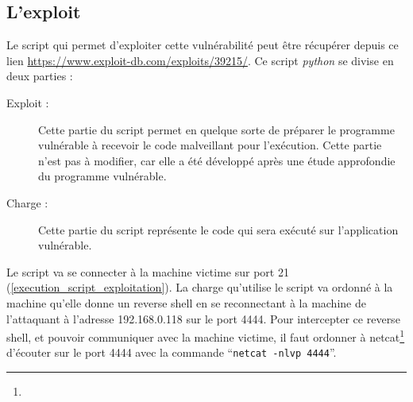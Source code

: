     \subsection{L'exploit}
    Le script qui permet d'exploiter cette vulnérabilité peut être récupérer depuis ce lien 
    \url{https://www.exploit-db.com/exploits/39215/}.
    Ce script \emph{python} se divise en deux parties :
    \begin{description}
        \item[Exploit :] Cette partie du script permet en quelque sorte de préparer le programme vulnérable à 
            recevoir le code malveillant pour l'exécution. Cette partie n'est pas à modifier, car elle a été développé
            après une étude approfondie du programme vulnérable.

        \item[Charge :] Cette partie du script représente le code qui sera exécuté sur l'application vulnérable.
    \end{description}

    Le script va se connecter à la machine victime sur port 21 (\autoref{execution_script_exploitation}). 
    La charge qu'utilise le 
    script va ordonné à la machine qu'elle donne un reverse shell en se reconnectant à la machine de l'attaquant 
    à l'adresse 192.168.0.118 sur le port 4444. Pour intercepter ce reverse shell, et pouvoir communiquer avec
    la machine victime, il faut ordonner à netcat\footnote{} d'écouter sur le port 4444 avec la commande ``\texttt{netcat -nlvp 4444}''.

